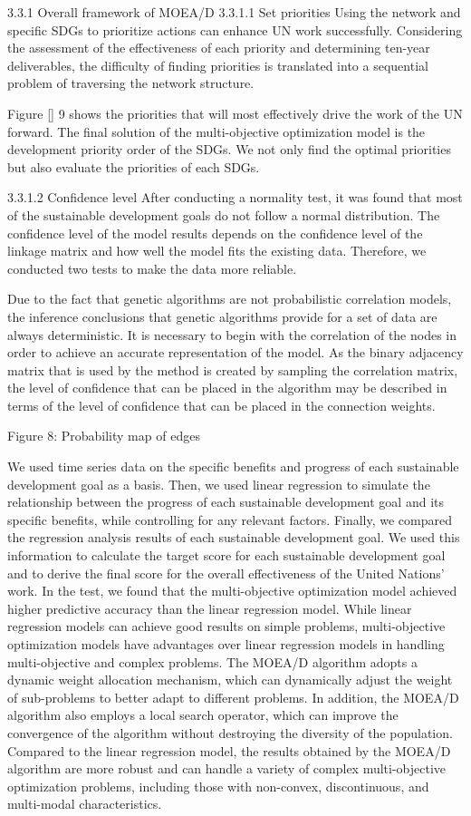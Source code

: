 3.3.1 Overall framework of MOEA/D
3.3.1.1 Set priorities
Using the network and specific SDGs to prioritize actions can enhance UN work successfully. Considering the assessment of the effectiveness of each priority and determining ten-year deliverables, the difficulty of finding priorities is translated into a sequential problem of traversing the
network structure.


Figure \ref{} 9 shows the priorities that will most effectively drive the work of the UN forward. The final solution of the multi-objective optimization model is the development priority order of the SDGs. We not only find the optimal priorities but also evaluate the priorities of each SDGs.

3.3.1.2 Confidence level
After conducting a normality test, it was found that most of the sustainable development goals do not follow a normal distribution. The confidence level of the model results depends on the confidence level of the linkage matrix and how well the model fits the existing data. Therefore, we conducted two tests to make the data more reliable.

Due to the fact that genetic algorithms are not probabilistic correlation models, the inference conclusions that genetic algorithms provide for a set of data are always deterministic. It is necessary to begin with the correlation of the nodes in order to achieve an accurate representation of the model. As the binary adjacency matrix that is used by the method is created by sampling the correlation matrix, the level of confidence that can be placed in the algorithm may be described in terms of the level of confidence that can be placed in the connection weights. 

Figure 8: Probability map of edges


We used time series data on the specific benefits and progress of each sustainable development goal as a basis. Then, we used linear regression to simulate the relationship between the progress of each sustainable development goal and its specific benefits, while controlling for any relevant factors. Finally, we compared the regression analysis results of each sustainable development goal. We used this information to calculate the target score for each sustainable development goal and to derive the final score for the overall effectiveness of the United Nations’ work. In the test, we found that the multi-objective optimization model achieved higher predictive accuracy than the linear regression model. While linear regression models can achieve good results on simple problems, multi-objective optimization models have advantages over linear regression models in handling multi-objective and complex problems. The MOEA/D algorithm adopts a dynamic weight allocation mechanism, which can dynamically adjust the weight of sub-problems to better adapt to different problems. In addition, the MOEA/D algorithm also employs a local search operator, which can improve the convergence of the algorithm without destroying the diversity of the population. Compared to the linear regression model, the results obtained by the MOEA/D algorithm are more robust and can handle a variety of complex multi-objective optimization problems, including those with non-convex, discontinuous, and multi-modal characteristics.

